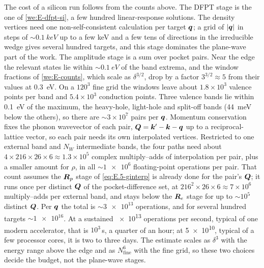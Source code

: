 The cost of a silicon run follows from the counts above. The DFPT stage is the one of \cref{we:E-dfpt-si}, a few hundred linear-response solutions. The density vertices need one non-self-consistent calculation per target $\bm{q}$; a grid of $|\bm{q}|$ in steps of $\sim\SI{0.1}{keV}$ up to a few keV and a few tens of directions in the irreducible wedge gives several hundred targets, and this stage dominates the plane-wave part of the work. The amplitude stage is a sum over pocket pairs. Near the edge the relevant states lie within $\sim\SI{0.1}{eV}$ of the band extrema, and the window fractions of \cref{we:E-counts}, which scale as $\delta^{3/2}$, drop by a factor $3^{3/2} \approx 5$ from their values at \SI{0.3}{eV}. On a $120^3$ fine grid the windows leave about $1.8\times10^3$ valence points per band and $5.4\times10^3$ conduction points. Three valence bands lie within \SI{0.1}{eV} of the maximum, the heavy-hole, light-hole and split-off bands (\SI{44}{meV} below the others), so there are $\sim3\times10^7$ pairs per $\bm{q}$. Momentum conservation fixes the phonon wavevector of each pair, $\bm{Q} = \bm{k}' - \bm{k} - \bm{q}$ up to a reciprocal-lattice vector, so each pair needs its own interpolated vertices. Restricted to one external band and $N_W$ intermediate bands, the four paths need about $4\times216\times26\times6 \approx 1.3\times10^5$ complex multiply--adds of interpolation per pair, plus a smaller amount for $\rho$, in all $\sim\num{1e6}$ floating-point operations per pair. That count assumes the $\bm{R}_p$ stage of \cref{eq:E.5-ginterp} is already done for the pair's $\bm{Q}$; it runs once per distinct $\bm{Q}$ of the pocket-difference set, at $216^2\times26\times6 \approx 7\times10^6$ multiply--adds per external band, and stays below the $\bm{R}_e$ stage for up to $\sim10^5$ distinct $\bm{Q}$. Per $\bm{q}$ the total is $\sim\num{3e13}$ operations, and for several hundred targets $\sim\num{1e16}$. At a sustained \num{e13} operations per second, typical of one modern accelerator, that is $10^3$\,s, a quarter of an hour; at \num{5e10}, typical of a few processor cores, it is two to three days. The estimate scales as $\delta^{3}$ with the energy range above the edge and as $N_{\mathrm{fine}}^6$ with the fine grid, so these two choices decide the budget, not the plane-wave stages.
